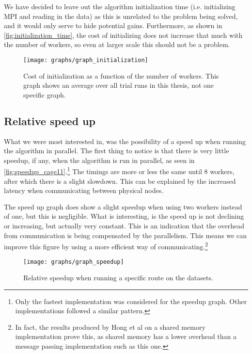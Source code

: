 We have decided to leave out the algorithm initialization time (i.e. initializing MPI and reading in the data) as this is unrelated to the problem being solved, and it would only serve to hide potential gains. Furthermore, as shown in \autoref{fig:initialization_time}, the cost of initializing does not increase that much with the number of workers, so even at larger scale this should not be a problem.

\begin{figure}
	\texttt{[image: graphs/graph\_initialization]}
  \caption{Cost of initialization as a function of the number of workers. This graph shows an average over all trial runs in this thesis, not one specific graph.}
  \label{fig:initialization_time}
\end{figure}

\subsection{Relative speed up}
What we were most interested in, was the possibility of a speed up when running the algorithm in parallel. 
The first thing to notice is that there is very little speedup, if any, when the algorithm is run in parallel, as seen in \autoref{fig:speedup_cage11}.\footnote{Only the fastest implementation was considered for the speedup graph. Other implementations followed a similar pattern.} The timings are more or less the same until 8 workers, after which there is a slight slowdown. This can be explained by the increased latency when communicating between physical nodes.

The speed up graph does show a slight speedup when using two workers instead of one, but this is negligible. What is interesting, is the speed up is not declining or increasing, but actually very constant. This is an indication that the overhead from communication is being compensated by the parallelism. This means we can improve this figure by using a more efficient way of communicating.\footnote{In fact, the results produced by Hong et al \cite{LockFreeMultithreadedMaxFlow} on a shared memory implementation prove this, as shared memory has a lower overhead than a message passing implementation such as this one.}

\begin{figure}
  \texttt{[image: graphs/graph\_speedup]}
  \caption{Relative speedup when running a specific route on the datasets.}
  \label{fig:speedup_cage11}
\end{figure}

